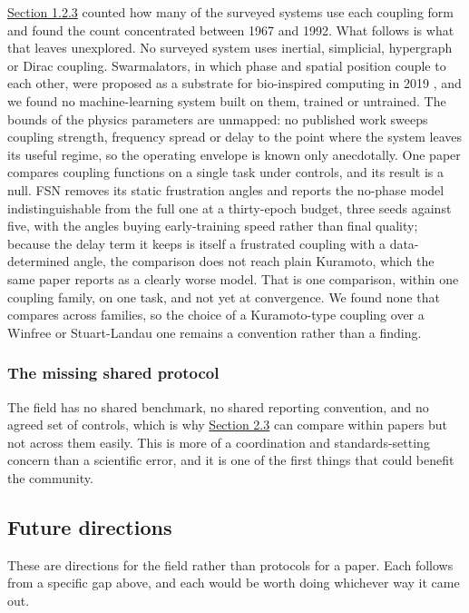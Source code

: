 \documentclass[10pt]{article}
\newcounter{none} %
\begin{document}
\hyperref[sec-1-2-3]{Section 1.2.3} counted how many of the surveyed
systems use each coupling form and found the count concentrated between
1967 and 1992. What follows is what that leaves unexplored. No surveyed
system uses inertial, simplicial, hypergraph or Dirac coupling.
Swarmalators, in which phase and spatial position couple to each other,
were proposed as a substrate for bio-inspired computing in 2019
\citep{o-keeffe2019}, and we found no machine-learning system built on
them, trained or untrained. The bounds of the physics parameters are
unmapped: no published work sweeps coupling strength, frequency spread
or delay to the point where the system leaves its useful regime, so the
operating envelope is known only anecdotally. One paper compares
coupling functions on a single task under controls, and its result is a
null. FSN removes its static frustration angles and reports the no-phase
model indistinguishable from the full one at a thirty-epoch budget,
three seeds against five, with the angles buying early-training speed
rather than final quality; because the delay term it keeps is itself a
frustrated coupling with a data-determined angle, the comparison does
not reach plain Kuramoto, which the same paper reports as a clearly
worse model. That is one comparison, within one coupling family, on one
task, and not yet at convergence. We found none that compares across
families, so the choice of a Kuramoto-type coupling over a Winfree or
Stuart-Landau one remains a convention rather than a finding.

\subsubsection{The missing shared protocol}\label{sec-3-1-6}

The field has no shared benchmark, no shared reporting convention, and
no agreed set of controls, which is why \hyperref[sec-2-3]{Section 2.3}
can compare within papers but not across them easily. This is more of a
coordination and standards-setting concern than a scientific error, and
it is one of the first things that could benefit the community.

\subsection{Future directions}\label{sec-3-2}

These are directions for the field rather than protocols for a paper.
Each follows from a specific gap above, and each would be worth doing
whichever way it came out.
\end{document}
